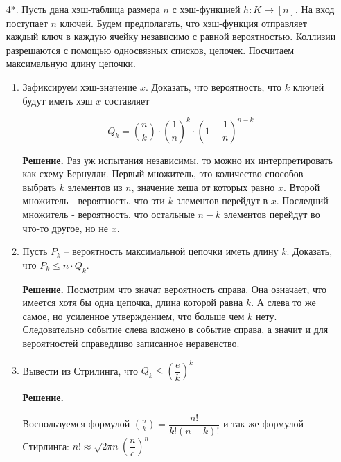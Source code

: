 \begin{enumerate}
	\item[4*.] Пусть дана хэш-таблица размера $n$ с хэш-функцией $h : K \rightarrow [n]$. На вход поступает $n$ 
	ключей. Будем предполагать, что хэш-функция отправляет каждый ключ в каждую ячейку независимо с равной 
	вероятностью. Коллизии разрешаются с помощью односвязных списков, цепочек. Посчитаем максимальную длину 
	цепочки.
	
	\begin{enumerate}
		\item Зафиксируем хэш-значение $x$. Доказать, что вероятность, что $k$ ключей будут иметь хэш $x$ 
		составляет
		
		\begin{equation*}
			Q_k = \binom{n}{k}\cdot \left( \frac{1}{n} \right)^k \cdot \left(1 - \frac{1}{n} \right)^{n-k}
		\end{equation*}
		
		\textbf{Решение.} Раз уж испытания независимы, то можно их интерпретировать как схему Бернулли. Первый 
		множитель, это количество способов выбрать $k$ элементов из $n$, значение хеша от которых равно $x$. 
		Второй множитель - вероятность, что эти $k$ элементов перейдут в $x$. Последний множитель - вероятность, 
		что остальные $n - k$ элементов перейдут во что-то другое, но не $x$.
		
		\item Пусть $P_k$ – вероятность максимальной цепочки иметь длину $k$. Доказать, что $P_k \leqslant n 
		\cdot Q_k$.
		
		\textbf{Решение.} Посмотрим что значат вероятность справа. Она означает, что имеется хотя бы одна 
		цепочка, длина которой равна $k$. А слева то же самое, но усиленное утверждением, что больше чем $k$ 
		нету. Следовательно событие слева вложено в событие справа, а значит и для вероятностей справедливо 
		записанное неравенство.
		
		\item Вывести из Стрилинга, что $Q_k \le \left(\dfrac{e}{k}\right)^k$
		
		\textbf{Решение.} 
		
		Воспользуемся формулой $\binom{n}{k} = \dfrac{n!}{k!(n-k)!}$ и так же формулой Стирлинга: $n! \approx \sqrt{2\pi n}\left(\dfrac{n}{e}\right)^n$
		

\end{enumerate}
\end{enumerate}
